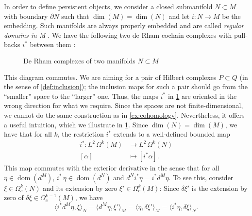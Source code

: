 \documentclass[11pt]{article}
\theoremstyle{definition}
\theoremstyle{remark}
\DeclareMathOperator\dom{dom}
\begin{document}
In order to define persistent objects, we consider a closed submanifold $N \subset M$ with boundary $\partial N$ such that $\dim(M)=\dim(N)$ and let $i:N\rightarrow M$ be the embedding. Such manifolds are always properly embedded \citep[Proposition 4.22 and Proposition 5.5]{lee} and are called \emph{regular domains in M} \citep[p.~120]{lee}. We have the following two de Rham cochain complexes with pull-backs $i^*$ between them \citep[see][Proposition~14.26]{lee}:
\begin{figure}[H]
    \centering
    \caption{De Rham complexes of two manifolds $N \subset M$}
    \label{fig:pairofhc}
\end{figure}
This diagram commutes. We are aiming for a pair of Hilbert complexes $P \subset Q$ (in the sense of \cref{def:inclusion}); the inclusion maps for such a pair should go from the ``smaller'' space to the ``larger'' one. Thus, the maps $i^*$ in \cref{fig:pairofhc} are oriented in the wrong direction for what we require. Since the spaces are not finite-dimensional, we cannot do the same construction as in \cref{ex:cohomology}. Nevertheless, it offers a useful intuition, which we illustrate in \cref{fig:pairofhc}. Since $\dim(N)=\dim(M)$, we have that for all $k$, the restriction $i^*$ extends to a well-defined bounded map 
\begin{align*}
    i^*:L^2 \, \Omega^k(M) &\rightarrow L^2 \, \Omega^k(N)\\
    [\alpha] &\mapsto [i^* \alpha].
\end{align*}
This map commutes with the exterior derivative in the sense that for all $\eta \in \dom(d^M)$, $i^* \, \eta \in \dom(d^N)$ and $d^N i^* \eta = i^* d^M \eta$. To see this, consider $\xi \in \Omega_c^k(N)$ and its extension by zero $\xi' \in \Omega_c^k(M)$: Since $\delta \xi'$ is the extension by zero of $\delta \xi \in \Omega_c^{k-1}(M)$, we have
$$
    \langle i^* d^M \eta, \xi \rangle_N = \langle d^M \eta, \xi' \rangle_M = \langle \eta, \delta \xi'\rangle_M = \langle i^* \eta , \delta \xi \rangle_N.
$$
\end{document}
